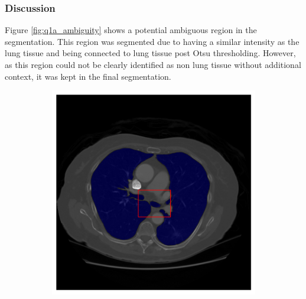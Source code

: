 \documentclass[11pt]{article}
\begin{document}
\subsubsection{Discussion}
Figure \ref{fig:q1a_ambiguity} shows a potential ambiguous region in the segmentation. This region was segmented due to having a similar intensity as the lung tissue and being connected to lung tissue post Otsu thresholding. However, as this region could not be clearly identified as non lung tissue without additional context, it was kept in the final segmentation.
\begin{figure}[H]
    \centering
    \begin{subfigure}{.4\textwidth}
        \centering
        \includegraphics[width=\linewidth]{figs/q1a_seg_w_bbox.png}  %
        \caption{}
        \label{fig:q1a_seg_w_bbox}
    \end{subfigure}%
    \begin{subfigure}{.4\textwidth}
        \centering

\end{subfigure}
\end{figure}
\end{document}

